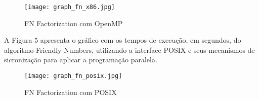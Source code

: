 \documentclass[12pt]{article}
\begin{document}
\begin{figure}[h!]
  \centering
  \texttt{[image: graph\_fn\_x86.jpg]}
  \caption{FN Factorization com OpenMP}
  \label{fig:LU OpenMP}
\end{figure}


A Figura 5 apresenta o gráfico com os tempos de execução, em segundos, do algoritmo Friendly Numbers, utilizando a interface POSIX e seus mecanismos de sicronização para aplicar a programação paralela.

\begin{figure}[h!]
  \centering
  \texttt{[image: graph\_fn\_posix.jpg]}
  \caption{FN Factorization com POSIX}
  \label{fig:FN POSIX}
\end{figure}

\end{document}
